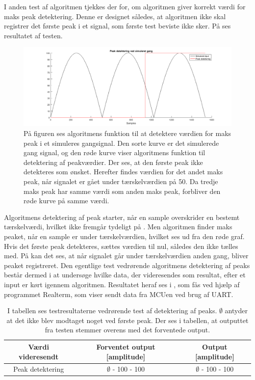 I anden test af algoritmen tjekkes der for, om algoritmen giver korrekt værdi for maks peak detektering. Denne er designet således, at algoritmen ikke skal registrer det første peak i et signal, som første test beviste ikke sker. På  ses resultatet af testen.
\begin{figure}[H]
	\centering
	\includegraphics[scale=0.3]{figures/cDesign/test_peak_gang.png}
	\caption{På figuren ses algoritmens funktion til at detektere værdien for maks peak i et simuleres gangsignal. Den sorte kurve er det simulerede gang signal, og den røde kurve viser algoritmens funktion til detektering af peakværdier. Der ses, at den første peak ikke detekteres som ønsket. Herefter findes værdien for det andet maks peak, når signalet er gået under tærskelværdien på 50. Da tredje maks peak har samme værdi som anden maks peak, forbliver den røde kurve på samme værdi.}
	\label{fig:test_peak_gang}
\end{figure}
Algoritmens detektering af peak starter, når en sample overskrider en bestemt tærskelværdi, hvilket ikke fremgår tydeligt på . Men algoritmen finder maks peaket, når en sample er under tærskelværdien, hvilket ses ud fra den røde graf. Hvis det første peak detekteres, sættes værdien til nul, således den ikke tælles med. På  kan det ses, at når signalet går under tærskelværdien anden gang, bliver peaket registreret. Den egentlige test vedrørende algoritmens detektering af peaks består dermed i at undersøge hvilke data, der videresendes som resultat, efter et input er kørt igennem algoritmen. Resultatet heraf ses i , som fås ved hjælp af programmet Realterm, som viser sendt data fra MCUen ved brug af UART.
\begin{table}[H]
	\centering
	\begin{tabular}{ccc}
		\hline
		\rowcolor[HTML]{C0C0C0} 
		Værdi videresendt & Forventet output [amplitude] & Output [amplitude] \\ \hline
		Peak detektering & $\emptyset$ - 100 - 100 & $\emptyset$ - 100 - 100 \\ \hline
	\end{tabular}
	\caption{I tabellen ses testresultaterne vedrørende test af detektering af peaks. $\emptyset$ antyder at det ikke blev modtaget noget ved første peak. Der ses i tabellen, at outputtet fra testen stemmer overens med det forventede output.}
	\label{tab:test_res_peak}
\end{table}\vspace{-0.5cm}
